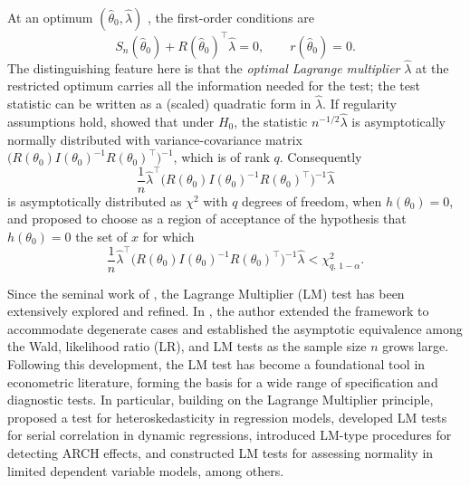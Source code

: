 \documentclass[12pt]{article}
\numberwithin{equation}{section}
\begin{document}
At an optimum \((\hat\theta_0,\hat\lambda)\) , the first-order conditions  are
\begin{equation}\label{eq:FOC}
S_n(\hat\theta_0)+R(\hat\theta_0)^\top\hat\lambda=0,\qquad r(\hat\theta_0)=0.
\end{equation}
The distinguishing feature here is that the \emph{optimal Lagrange multiplier} \(\hat\lambda\) at the restricted optimum carries all the information needed for the test; the test statistic can be written as a (scaled) quadratic form in \(\hat\lambda\).
If regularity assumptions hold, \cite{silvey1958} showed that under $H_0$, the statistic $n^{-1/2}\hat{\lambda}$ is asymptotically normally distributed  
with variance-covariance matrix $\Big(R(\theta_0)I(\theta_0)^{-1}R(\theta_0)^\top\Big)^{-1}$, which is of rank $q$. 
Consequently 
\[
\frac{1}{n}\hat{\lambda}^\top \Big(R(\theta_0)I(\theta_0)^{-1}R(\theta_0)^\top\Big)^{-1} \hat{\lambda}
\]
is asymptotically distributed as $\chi^2$ with $q$ degrees of freedom, 
when $h(\theta_0)=0$, and \cite{silvey1958} proposed to choose as a region of acceptance of the hypothesis that $h(\theta_0)=0$ 
the set of $x$ for which
\[
\frac{1}{n}\hat{\lambda}^\top \Big(R(\theta_0)I(\theta_0)^{-1}R(\theta_0)^\top\Big)^{-1} \hat{\lambda} < \chi^2_{q,\,1-\alpha}.
\]

Since the seminal work of \cite{silvey1958}, the Lagrange Multiplier (LM) test has been extensively explored and refined. In \cite{silvey1959}, the author extended the framework to accommodate degenerate cases and established the asymptotic equivalence among the Wald, likelihood ratio (LR), and LM tests as the sample size $n$ grows large. Following this development, the LM test has become a foundational tool in econometric literature, forming the basis for a wide range of specification and diagnostic tests. In particular, building on the Lagrange Multiplier principle, \cite{bp_test} proposed a test for heteroskedasticity in regression models, \cite{godfrey1978testing1, godfrey1978testing2} developed LM tests for serial correlation in dynamic regressions, \cite{engle1982autoregressive} introduced LM-type procedures for detecting ARCH effects, and \cite{bera1984testing} constructed LM tests for assessing normality in limited dependent variable models, among others.
\end{document}
